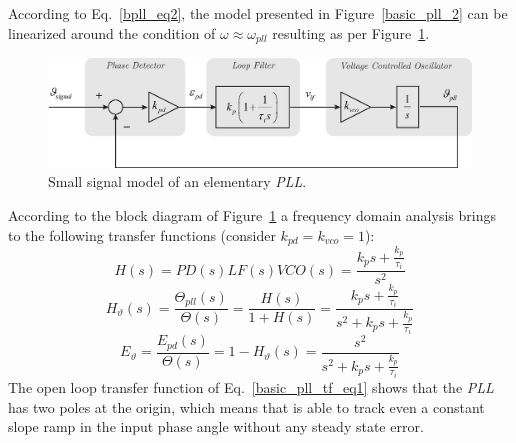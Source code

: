 \documentclass[11pt,a4paper,oneside]{book}
\numberwithin{equation}{section}
\theoremstyle{it}
\theoremstyle{definition}
\begin{document}
According to Eq.~\eqref{bpll_eq2}, the model presented in Figure~\ref{basic_pll_2} can be linearized around the condition of $\omega\approx\omega_{pll}$ resulting as per Figure~\ref{basic_pll_3}.
\begin{figure}[H]
	\centering
	\includegraphics[width = 400pt, angle = 0, 
	keepaspectratio]{figures/basic_pll_3.eps}
	\captionsetup{width=0.5\textwidth, font=small}
	\caption{Small signal model of an elementary \textit{PLL}.}
	\label{basic_pll_3}
\end{figure}
According to the block diagram of Figure~\ref{basic_pll_3} a frequency domain analysis brings to the following transfer functions (consider $k_{pd}=k_{vco}=1$):
\begin{equation}\label{basic_pll_tf_eq1}
	H(s)=PD(s)LF(s)VCO(s)=\frac{k_ps+\frac{k_p}{\tau_i}}{s^2} 
\end{equation}
\begin{equation}\label{basic_pll_tf_eq2}
	H_{\vartheta}(s)=\frac{\Theta_{pll}(s)}{\Theta(s)}=\frac{H(s)}{1+H(s)}= \frac{k_ps+\frac{k_p}{\tau_i}}{s^2+k_ps+\frac{k_p}{\tau_i}}
\end{equation}
\begin{equation}\label{basic_pll_tf_eq3}
	E_{\vartheta}=\frac{E_{pd}(s)}{\Theta(s)}=1-H_{\vartheta}(s)=\frac{s^2}{s^2+k_ps+\frac{k_p}{\tau_i}}
\end{equation}
The open loop transfer function of Eq.~\eqref{basic_pll_tf_eq1} shows that the \textit{PLL} has two poles at the origin, which means that is able to track even a constant slope ramp in the input phase angle without any steady state error. 

 
\end{document}

